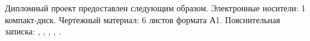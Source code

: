 \label{sec:ref}


Дипломный проект предоставлен следующим образом. Электронные носители: 1
компакт-диск. Чертежный материал: 6 листов формата А1. Пояснительная записка:
\insertNumPagesText ,
\insertNumFiguresText , \insertNumTablesText ,
\insertNumBibElementsText ,
\insertNumAnnexesText .

\newpage
